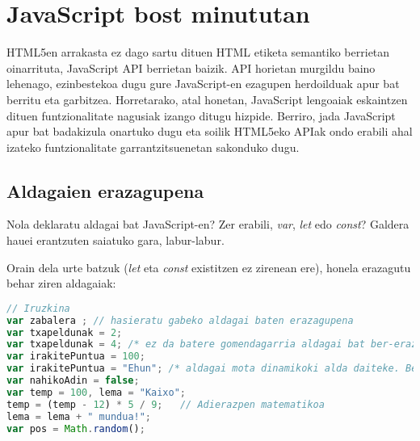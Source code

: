 \chapter{JavaScript bost minututan}

HTML5en arrakasta ez dago sartu dituen HTML etiketa semantiko berrietan oinarrituta,  JavaScript API berrietan baizik. API horietan murgildu baino lehenago, ezinbestekoa dugu gure JavaScript-en ezagupen herdoilduak apur bat berritu eta garbitzea. Horretarako, atal honetan, JavaScript lengoaiak eskaintzen dituen funtzionalitate nagusiak izango ditugu hizpide. Berriro, jada JavaScript apur bat badakizula onartuko dugu eta soilik HTML5eko APIak ondo erabili ahal izateko  funtzionalitate garrantzitsuenetan sakonduko dugu.


\section{Aldagaien erazagupena}
 Nola deklaratu aldagai bat JavaScript-en? Zer erabili, \textit{var}, \textit{let} edo \textit{const}? Galdera hauei erantzuten saiatuko gara, labur-labur.

Orain dela urte batzuk (\textit{let} eta \textit{const} existitzen ez zirenean ere), honela erazagutu behar ziren aldagaiak:

\begin{lstlisting}[language=JavaScript]
// Iruzkina
var zabalera ; // hasieratu gabeko aldagai baten erazagupena
var txapeldunak = 2;
var txapeldunak = 4; /* ez da batere gomendagarria aldagai bat ber-erazagutzea, baina 'var' erabiliz, posible da */
var irakitePuntua = 100;
var irakitePuntua = "Ehun"; /* aldagai mota dinamikoki alda daiteke. Berriro, ez da batere gomendagarria, baina egin daiteke */
var nahikoAdin = false;
var temp = 100, lema = "Kaixo";
temp = (temp - 12) * 5 / 9;   // Adierazpen matematikoa
lema = lema + " mundua!"; 
var pos = Math.random(); 

\end{lstlisting}

